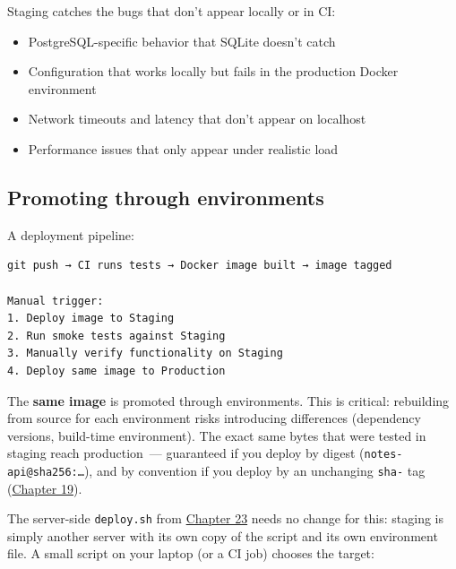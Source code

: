 \noindent{}Staging catches the bugs that don't appear locally or in CI:

\begin{itemize}
\tightlist
\item
  PostgreSQL-specific behavior that SQLite doesn't catch
\item
  Configuration that works locally but fails in the production Docker environment
\item
  Network timeouts and latency that don't appear on localhost
\item
  Performance issues that only appear under realistic load
\end{itemize}

\subsection*{Promoting through environments}\label{39-local-vs-production:promoting-through-environments}

A deployment pipeline:

\begin{outputbox}[short]
\begin{Verbatim}[fontsize=\codesize, breaklines, breakanywhere, breaksymbolleft={\tiny\textcolor{muted}{$\hookrightarrow$}}]
git push → CI runs tests → Docker image built → image tagged

Manual trigger:
1. Deploy image to Staging
2. Run smoke tests against Staging
3. Manually verify functionality on Staging
4. Deploy same image to Production
\end{Verbatim}
\end{outputbox}

\noindent{}The \textbf{same image} is promoted through environments. This is critical: rebuilding from source for each environment risks introducing differences (dependency versions, build-time environment). The exact same bytes that were tested in staging reach production~--- guaranteed if you deploy by digest (\texttt{notes-api@sha256:…}), and by convention if you deploy by an unchanging \texttt{sha-} tag (\hyperref[ch:19-artifact-storage]{Chapter 19}).

The server-side \texttt{deploy.sh} from \hyperref[ch:23-code-transfer]{Chapter 23} needs no change for this: staging is simply another server with its own copy of the script and its own environment file. A small script on your laptop (or a CI job) chooses the target:

